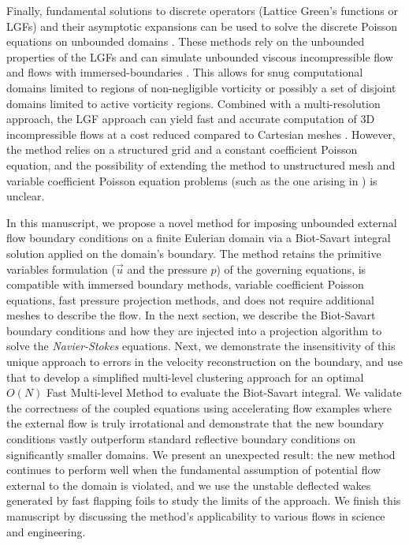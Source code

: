 \documentclass[final,1p,times]{elsarticle}
\begin{document}
Finally, fundamental solutions to discrete operators (Lattice Green's functions or LGFs) and their asymptotic expansions can be used to solve the discrete Poisson equations on unbounded domains \cite{Liska2014AEquations, Beckers2022PlanarGrids}. 
These methods rely on the unbounded properties of the LGFs and can simulate unbounded viscous incompressible flow \cite{Liska2016ADomains} and flows with immersed-boundaries \cite{Liska2017AFunctions}. This allows for snug computational domains limited to regions of non-negligible vorticity or possibly a set of disjoint domains limited to active vorticity regions. Combined with a multi-resolution approach, the LGF approach can yield fast and accurate computation of 3D incompressible flows at a cost reduced compared to Cartesian meshes \cite{Dorschner2020AEquations}. However, the method relies on a structured grid and a constant coefficient Poisson equation, and the possibility of extending the method to unstructured mesh and variable coefficient Poisson equation problems (such as the one arising in \cite{Lauber2022}) is unclear.

In this manuscript, we propose a novel method for imposing unbounded external flow boundary conditions on a finite Eulerian domain via a Biot-Savart integral solution applied on the domain's boundary.
The method retains the primitive variables formulation ($\vec u$ and the pressure $p$) of the governing equations, is compatible with immersed boundary methods, variable coefficient Poisson equations, fast pressure projection methods, and does not require additional meshes to describe the flow. In the next section, we describe the Biot-Savart boundary conditions and how they are injected into a projection algorithm to solve the \emph{Navier-Stokes} equations. Next, we demonstrate the insensitivity of this unique approach to errors in the velocity reconstruction on the boundary, and use that to develop a simplified multi-level clustering approach for an optimal $O(N)$ Fast Multi-level Method to evaluate the Biot-Savart integral. We validate the correctness of the coupled equations using accelerating flow examples where the external flow is truly irrotational and demonstrate that the new boundary conditions vastly outperform standard reflective boundary conditions on significantly smaller domains. We present an unexpected result: the new method continues to perform well when the fundamental assumption of potential flow external to the domain is violated, and we use the unstable deflected wakes generated by fast flapping foils to study the limits of the approach. We finish this manuscript by discussing the method's applicability to various flows in science and engineering.
\end{document}
